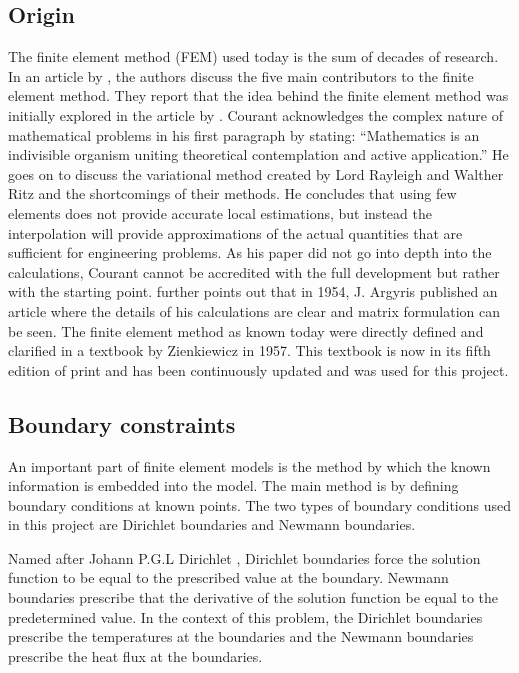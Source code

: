 	\subsection{Origin}
	The finite element method  (FEM) used today is the sum of decades of research. 
	In an article by \citet{Gupta:1996}, the authors discuss the five main contributors to the finite element method. 
	They report that the idea behind the finite element method was initially explored in the \citeyear{Courant:1943} article by \citeauthor{Courant:1943}.
	Courant acknowledges the complex nature of mathematical problems in his first paragraph by stating: ``Mathematics is an indivisible organism uniting theoretical contemplation and active application.''
	He goes on to discuss the variational method created by Lord Rayleigh and Walther Ritz and the shortcomings of their methods.
	He concludes that using few elements does not provide accurate local estimations, but instead the interpolation will provide approximations of the actual quantities that are sufficient for engineering problems.
	As his paper did not go into depth into the calculations, Courant cannot be accredited with the full development but rather with the starting point.
	\citet{Gupta:1996} further points out that in 1954, J. Argyris published an article  where the details of his calculations are clear and matrix formulation can be seen.
	The finite element method as known today were directly defined and clarified in a textbook by Zienkiewicz in 1957.
	This textbook is now in its fifth edition of print and has been continuously updated and was used for this project.
	
	\subsection{Boundary constraints}
	An important part of finite element models is the method by which the known information is embedded into the model.
	The main method is by defining boundary conditions at known points. The two types of boundary conditions used in this project are Dirichlet boundaries and Newmann boundaries.
	
	Named after Johann P.G.L Dirichlet \citep{Cheng:2005}, Dirichlet boundaries force the solution function to be equal to the prescribed value at the boundary. 
	Newmann boundaries prescribe that the derivative of the solution function be equal to the predetermined value. 
	In the context of this problem, the Dirichlet boundaries prescribe the temperatures at the boundaries and the Newmann boundaries prescribe the heat flux at the boundaries.
	
